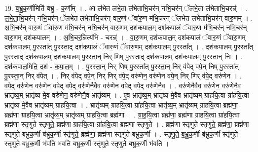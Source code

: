 \documentclass[17pt]{extarticle}
\begin{document}
19. ब॒भ्रु॒क॒र्णीमिति॑ बभ्रु - क॒र्णीम् । . आ ल॑भेत लभे॒ता ल॑भेताभि॒चर॑न् नभि॒चर॑न् ॅलभे॒ता ल॑भेताभि॒चरन्न्॑ । . ल॒भे॒ता॒भि॒चर॑न् नभि॒चर॑न् ॅलभेत लभेताभि॒चर॑न् वारु॒णं ॅवा॑रु॒ण म॑भि॒चर॑न् ॅलभेत लभेताभि॒चर॑न् वारु॒णम् । . अ॒भि॒चर॑न् वारु॒णं ॅवा॑रु॒ण म॑भि॒चर॑न् नभि॒चर॑न् वारु॒णम् दश॑कपाल॒म् दश॑कपालं ॅवारु॒ण म॑भि॒चर॑न् नभि॒चर॑न् वारु॒णम् दश॑कपालम् । . अ॒भि॒चर॒न्नित्य॑भि - चरन्न्॑ । . वा॒रु॒णम् दश॑कपाल॒म् दश॑कपालं ॅवारु॒णं ॅवा॑रु॒णम् दश॑कपालम् पु॒रस्ता᳚त् पु॒रस्ता॒द् दश॑कपालं ॅवारु॒णं ॅवा॑रु॒णम् दश॑कपालम् पु॒रस्ता᳚त् । . दश॑कपालम् पु॒रस्ता᳚त् पु॒रस्ता॒द् दश॑कपाल॒म् दश॑कपालम् पु॒रस्ता॒न् निर् णिष् पु॒रस्ता॒द् दश॑कपाल॒म् दश॑कपालम् पु॒रस्ता॒न् निः । . दश॑कपाल॒मिति॒ दश॑ - क॒पा॒ल॒म् । . पु॒रस्ता॒न् निर् णिष् पु॒रस्ता᳚त् पु॒रस्ता॒न् निर् व॑पेद् वपे॒न् निष् पु॒रस्ता᳚त् पु॒रस्ता॒न् निर् व॑पेत् । . निर् व॑पेद् वपे॒न् निर् णिर् व॑पे॒द् वरु॑णेन॒ वरु॑णेन वपे॒न् निर् णिर् व॑पे॒द् वरु॑णेन । . व॒पे॒द् वरु॑णेन॒ वरु॑णेन वपेद् वपे॒द् वरु॑णेनै॒वैव वरु॑णेन वपेद् वपे॒द् वरु॑णेनै॒व । . वरु॑णेनै॒वैव वरु॑णेन॒ वरु॑णेनै॒व भ्रातृ॑व्य॒म् भ्रातृ॑व्य मे॒व वरु॑णेन॒ वरु॑णेनै॒व भ्रातृ॑व्यम् । . ए॒व भ्रातृ॑व्य॒म् भ्रातृ॑व्य मे॒वैव भ्रातृ॑व्यम् ग्राहयि॒त्वा ग्रा॑हयि॒त्वा भ्रातृ॑व्य मे॒वैव भ्रातृ॑व्यम् ग्राहयि॒त्वा । . भ्रातृ॑व्यम् ग्राहयि॒त्वा ग्रा॑हयि॒त्वा भ्रातृ॑व्य॒म् भ्रातृ॑व्यम् ग्राहयि॒त्वा ब्रह्म॑णा॒ ब्रह्म॑णा ग्राहयि॒त्वा भ्रातृ॑व्य॒म् भ्रातृ॑व्यम् ग्राहयि॒त्वा ब्रह्म॑णा । . ग्रा॒ह॒यि॒त्वा ब्रह्म॑णा॒ ब्रह्म॑णा ग्राहयि॒त्वा ग्रा॑हयि॒त्वा ब्रह्म॑णा स्तृणुते स्तृणुते॒ ब्रह्म॑णा ग्राहयि॒त्वा ग्रा॑हयि॒त्वा ब्रह्म॑णा स्तृणुते । . ब्रह्म॑णा स्तृणुते स्तृणुते॒ ब्रह्म॑णा॒ ब्रह्म॑णा स्तृणुते बभ्रुक॒र्णी ब॑भ्रुक॒र्णी स्तृ॑णुते॒ ब्रह्म॑णा॒ ब्रह्म॑णा स्तृणुते बभ्रुक॒र्णी । . स्तृ॒णु॒ते॒ ब॒भ्रु॒क॒र्णी ब॑भ्रुक॒र्णी स्तृ॑णुते स्तृणुते बभ्रुक॒र्णी भ॑वति भवति बभ्रुक॒र्णी स्तृ॑णुते स्तृणुते बभ्रुक॒र्णी भ॑वति । \newline
\end{document}

